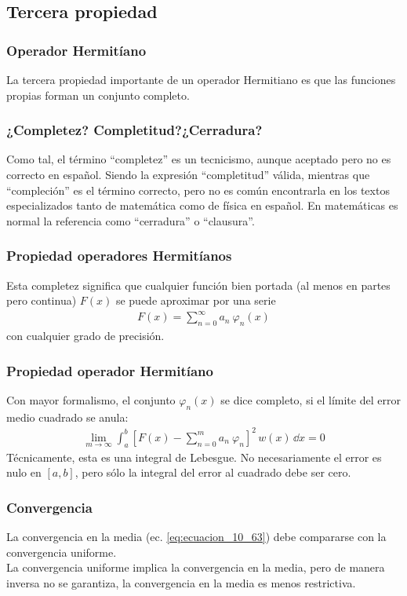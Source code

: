 \subsection{Tercera propiedad}
\begin{frame}
\frametitle{Operador Hermitíano}
La tercera propiedad importante de un operador Hermitiano es que las funciones propias forman un conjunto completo. 
\end{frame}
\begin{frame}
\frametitle{¿Completez? Completitud?¿Cerradura?}
Como tal, el término \enquote{completez} es un tecnicismo, aunque aceptado pero no es correcto en español. Siendo la expresión \enquote{completitud} válida, mientras que \enquote{compleción} es el término correcto, pero no es común encontrarla en los textos especializados tanto de matemática como de física en español. En matemáticas es normal la referencia como \enquote{cerradura} o \enquote{clausura}.
\end{frame}
\begin{frame}
\frametitle{Propiedad operadores Hermitíanos}
Esta completez significa que cualquier función bien portada (al menos en partes pero continua) $F(x)$ se puede aproximar por una serie
\begin{align}
F(x) = \sum_{n=0}^{\infty} a_{n} \: \varphi_{n}(x) 
\label{eq:ecuacion_10_62}
\end{align}
con cualquier grado de precisión.
\end{frame}
\begin{frame}
\frametitle{Propiedad operador Hermitíano}
Con mayor formalismo, el conjunto $\varphi_{n} (x)$ se dice completo, si el límite del error medio cuadrado se anula:
\begin{align}
\lim_{m \to \infty} \int_{a}^{b} \left[ F(x) - \sum_{n=0}^{m} a_{n} \: \varphi_{n} \right]^{2} \, w(x) \, \dd{x} = 0
\label{eq:ecuacion_10_63}
\end{align}
\pause
Técnicamente, esta es una integral de Lebesgue. No necesariamente el error es nulo en $[a,b]$, pero sólo la integral del error al cuadrado debe ser cero.
\end{frame}
\begin{frame}
\frametitle{Convergencia}
La convergencia en la media (ec. \ref{eq:ecuacion_10_63}) debe compararse con la convergencia uniforme.
\\
\bigskip
\pause
La convergencia uniforme implica la convergencia en la media, pero de manera inversa no se garantiza, la convergencia en la media es menos restrictiva.
\end{frame}
